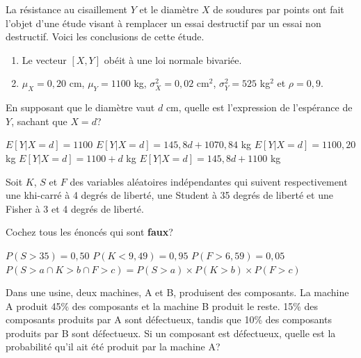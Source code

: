 \begin{questions}
\begin{solution}
\end{solution}

\question[3]\label{normaleBivariee}
La résistance au cisaillement $Y$ et le diamètre $X$ de soudures par points ont fait l'objet d'une étude visant à remplacer un essai destructif par un essai non destructif. Voici les conclusions de cette étude.
\begin{enumerate}
    \item Le vecteur $[X,Y]$ obéit à une loi normale bivariée.
    \item $\mu_X=0,20$ cm, $\mu_Y=1100$ kg, $\sigma^2_X=0,02$ cm$^2$, $\sigma^2_Y=525$ kg$^2$ et $\rho = 0,9$.
\end{enumerate}

En supposant que le diamètre vaut $d$ cm, quelle est l'expression de l'espérance de $Y$, sachant que $X=d$?

 \begin{checkboxes}
		\choice $E[Y|X=d]=1100$  %
		\correctchoice $E[Y|X=d]=145,8d + 1070,84$ kg %
		\choice $E[Y|X=d]=1100,20$ kg %
		\choice $E[Y|X=d]=1100+d$ kg%
		\choice $E[Y|X=d]=145,8d + 1100$ kg%
\end{checkboxes}

\vspace{0.5cm}

\question[3] Soit $K$, $S$ et $F$ des variables aléatoires indépendantes qui suivent respectivement une khi-carré à 4 degrés de liberté, une Student à 35 degrés de liberté et une Fisher à 3 et 4 degrés de liberté. 

Cochez tous les énoncés qui sont \textbf{faux}?

\begin{checkboxes}
		\correctchoice $P(S>35)=0,50$
		\choice $P(K<9,49)=0,95$
		\choice $P(F>6,59)=0,05$
		\choice $P(S>a \cap K> b \cap F >c)= P(S>a)\times P(K>b)\times P(F>c)$
\end{checkboxes}

\newpage
\question[6]\label{module1_2} 
Dans une usine, deux machines, A et B, produisent des composants. La machine A produit 45\% des composants et la machine B produit le reste. 15\% des composants produits par A sont défectueux, tandis que 10\% des composants produits par B sont défectueux. Si un composant est défectueux, quelle est la probabilité qu'il ait été produit par la machine A?


\end{questions}
